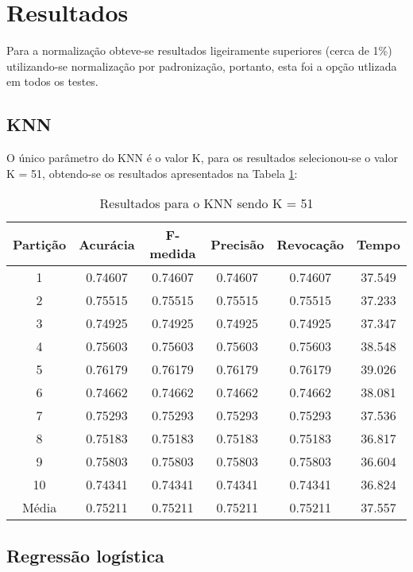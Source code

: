 \section{Resultados}

Para a normalização obteve-se resultados ligeiramente superiores (cerca de 1\%) utilizando-se normalização por padronização, portanto, esta foi a opção utlizada em todos os testes.

\subsection{KNN}

O único parâmetro do KNN é o valor K, para os resultados selecionou-se o valor K = 51, obtendo-se os resultados apresentados na Tabela \ref{table:resultadosKNN}:

\begin{table}[h]
\centering
\caption{Resultados para o KNN sendo K = 51}
\vspace{0.2cm}
\begin{tabular}{c|c|c|c|c|c}
Partição & Acurácia & F-medida & Precisão & Revocação & Tempo \\
\hline
1  & 0.74607 & 0.74607 & 0.74607 & 0.74607 & 37.549 \\
2  & 0.75515 & 0.75515 & 0.75515 & 0.75515 & 37.233 \\
3  & 0.74925 & 0.74925 & 0.74925 & 0.74925 & 37.347 \\
4  & 0.75603 & 0.75603 & 0.75603 & 0.75603 & 38.548 \\
5  & 0.76179 & 0.76179 & 0.76179 & 0.76179 & 39.026 \\
6  & 0.74662 & 0.74662 & 0.74662 & 0.74662 & 38.081 \\
7  & 0.75293 & 0.75293 & 0.75293 & 0.75293 & 37.536 \\
8  & 0.75183 & 0.75183 & 0.75183 & 0.75183 & 36.817 \\
9  & 0.75803 & 0.75803 & 0.75803 & 0.75803 & 36.604 \\
10 & 0.74341 & 0.74341 & 0.74341 & 0.74341 & 36.824 \\
\hline
Média & 0.75211 & 0.75211 & 0.75211 & 0.75211 & 37.557

\end{tabular} 
\label{table:resultadosKNN}
\end{table}

\subsection{Regressão logística}

